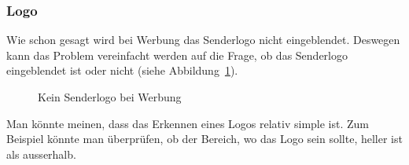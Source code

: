 \documentclass[12pt,a4paper]{report}
\begin{document}
\subsubsection{Logo}
Wie schon gesagt wird bei Werbung das Senderlogo nicht eingeblendet.
Deswegen kann das Problem vereinfacht werden auf die Frage,
ob das Senderlogo eingeblendet ist oder nicht (siehe Abbildung~\ref{fig:logo1}).
\begin{figure}[h]%
    \centering
    \qquad
    \caption{Kein Senderlogo bei Werbung}%
    \label{fig:logo1}%
\end{figure}
Man könnte meinen, dass das Erkennen eines Logos relativ simple ist.
Zum Beispiel könnte man überprüfen, ob der Bereich, wo das Logo sein sollte, heller ist als ausserhalb.
\end{document}
